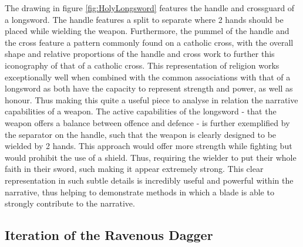 \documentclass{article}
\begin{document}
The drawing in figure \ref{fig:HolyLongsword} features the handle and crossguard of a longsword. The handle features a split to separate where 2 hands should be placed while wielding the weapon. Furthermore, the pummel of the handle and the cross feature a pattern commonly found on a catholic cross, with the overall shape and relative proportions of the handle and cross work to further this iconography of that of a catholic cross. This representation of religion works exceptionally well when combined with the common associations with that of a longsword as both have the capacity to represent strength and power, as well as honour. Thus making this quite a useful piece to analyse in relation the narrative capabilities of a weapon. The active capabilities of the longsword - that the weapon offers a balance between offence and defence - is further exemplified by the separator on the handle, such that the weapon is clearly designed to be wielded by 2 hands. This approach would offer more strength while fighting but would prohibit the use of a shield. Thus, requiring the wielder to put their whole faith in their sword, such making it appear extremely strong. This clear representation in such subtle details is incredibly useful and powerful within the narrative, thus helping to demonstrate methods in which a blade is able to strongly contribute to the narrative.

\pagebreak

\subsection{Iteration of the Ravenous Dagger} \label{Iteration7}
\end{document}
